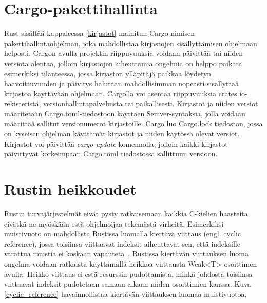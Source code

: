\begin{minipage}{\linewidth}

\end{minipage}

\section{Cargo-pakettihallinta}
Rust sisältää kappaleessa \ref{kirjastot} mainitun Cargo-nimisen pakettihallintaohjelman, joka mahdollistaa kirjastojen sisällyttämisen ohjelmaan helposti. Cargon avulla projektin riippuvuuksia voidaan päivittää tai niiden versiota alentaa, jolloin kirjastojen aiheuttamia ongelmia on helppo paikata esimerkiksi tilanteessa, jossa kirjaston ylläpitäjä paikkaa löydetyn haavoittuvuuden ja päivitys halutaan mahdollisimman nopeasti sisällyttää kirjastoa käyttävään ohjelmaan. Cargolla voi asentaa riippuvuuksia crates io-rekisteristä, versionhallintapalveluista tai paikallisesti. Kirjastot ja niiden versiot määritetään Cargo.toml-tiedostoon käyttäen Semver-syntaksia, jolla voidaan määrittää sallitut versionumerot kirjastoille. Cargo luo Cargo.lock tiedoston, jossa on kyseisen ohjelman käyttämät kirjastot ja niiden käytössä olevat versiot. Kirjastot voi päivittää \textit{cargo update}-komennolla, jolloin kaikki kirjastot päivittyvät korkeimpaan Cargo.toml tiedostossa sallittuun versioon.

\section{Rustin heikkoudet}
Rustin turvajärjestelmät eivät pysty ratkaisemaan kaikkia C-kielien haasteita eivätkä ne myöskään estä ohjelmoijaa tekemästä virheitä. Esimerkiksi muistivuoto on mahdollista Rustissa luomalla kiertävä viittaus (engl. cyclic reference), jossa toisiinsa viittaavat indeksit aiheuttavat sen, että indeksille varattua muistia ei koskaan vapauteta~\cite[chapter~15.6]{rustbook}. Rustissa kiertävän viittauksen luoma ongelma voidaan ratkaista käyttämällä heikkoa viittausta Weak<T>-osoittimen avulla. Heikko viittaus ei estä resurssin pudottamista, minkä johdosta toisiinsa viittaavat indeksit pudotetaan samaan aikaan niiden osoittimien kanssa. Kuva \ref{cyclic_reference} havainnollistaa kiertävän viittauksen luomaa muistivuotoa.

